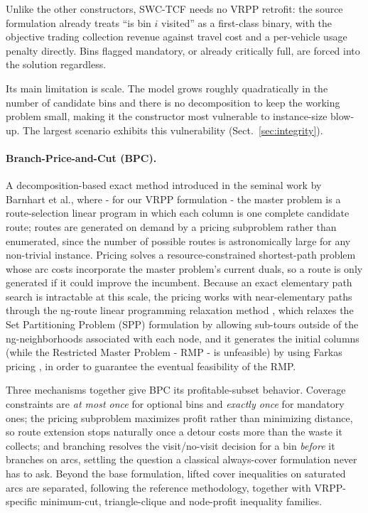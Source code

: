 \documentclass[orivec,runningheads]{llncs}
\begin{document}
Unlike the other constructors, SWC-TCF needs no VRPP retrofit: the source
formulation already treats ``is bin $i$ visited'' as a first-class binary, with
the objective trading collection revenue against travel cost and a per-vehicle
usage penalty directly. Bins flagged mandatory, or already critically full, are
forced into the solution regardless.

Its main limitation is scale. The model grows roughly quadratically in the number of
candidate bins and there is no decomposition to keep the working problem small,
making it the constructor most vulnerable to instance-size blow-up. The largest
scenario exhibits this vulnerability
(Sect.~\ref{sec:integrity}).

\paragraph{Branch-Price-and-Cut (BPC).}
A decomposition-based exact method introduced in the seminal work \cite{BARNHART1970} by Barnhart et al., where - for our VRPP formulation - the master problem is a route-selection
linear program in which each column is one complete candidate route; routes are
generated on demand by a pricing subproblem rather than enumerated, since the
number of possible routes is astronomically large for any non-trivial instance.
Pricing solves a resource-constrained shortest-path problem whose arc costs
incorporate the master problem's current duals, so a route is only generated if
it could improve the incumbent. Because an exact elementary path search is intractable at this scale, the pricing works with near-elementary paths through the ng-route linear programming relaxation method \cite{BALDACCI2011}, which relaxes the Set Partitioning Problem (SPP) formulation by allowing sub-tours outside of the ng-neighborhoods associated with each node, and it generates the initial columns (while the Restricted Master Problem - RMP - is unfeasible) by using Farkas pricing \cite{Lin2017}, in order to guarantee the eventual feasibility of the RMP. 

Three mechanisms together give BPC its profitable-subset behavior. Coverage
constraints are \emph{at most once} for optional bins and \emph{exactly once} for
mandatory ones; the pricing subproblem maximizes profit rather than minimizing
distance, so route extension stops naturally once a detour costs more than the
waste it collects; and branching resolves the visit/no-visit decision for a bin
\emph{before} it branches on arcs, settling the question a classical
always-cover formulation never has to ask. Beyond the base formulation, lifted
cover inequalities \cite{Gu1999LiftedCI} on saturated arcs are separated, following the reference
methodology, together with VRPP-specific minimum-cut, triangle-clique and
node-profit inequality families.
\end{document}
